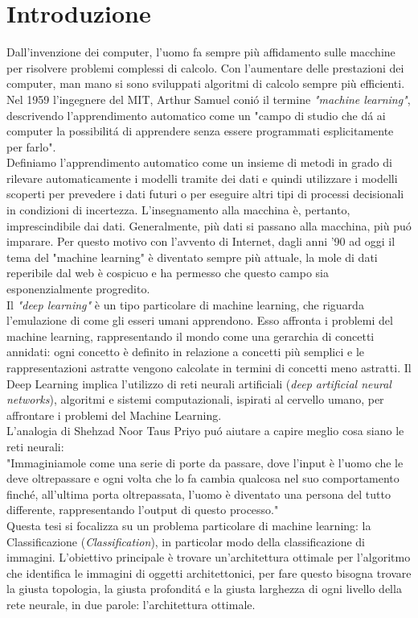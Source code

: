 \documentclass[a4paper,12pt]{report}
\begin{document}
\section*{Introduzione}
Dall'invenzione dei computer, l'uomo fa sempre pi\`{u} affidamento sulle macchine per risolvere problemi complessi di calcolo. Con l'aumentare delle prestazioni dei computer, man mano si sono sviluppati algoritmi di calcolo sempre pi\`{u} efficienti.
Nel 1959 l'ingegnere del MIT, Arthur Samuel coni\'{o} il termine \textit{"machine learning"}, descrivendo l'apprendimento automatico come un "campo di studio che d\'{a} ai computer la possibilit\'{a} di apprendere senza essere programmati esplicitamente per farlo".\cite{Samuel} \\
Definiamo l'apprendimento automatico come un insieme di metodi in grado di rilevare automaticamente i modelli tramite dei dati e quindi utilizzare i modelli scoperti per prevedere i dati futuri o per eseguire altri tipi di processi decisionali in condizioni di incertezza. L'insegnamento alla macchina \`e, pertanto, imprescindibile dai dati. Generalmente, pi\`{u} dati si passano alla macchina, pi\`{u} pu\'{o} imparare. Per questo motivo con l'avvento di Internet, dagli anni '90 ad oggi il tema del "machine learning" \`e diventato sempre pi\`{u} attuale, la mole di dati reperibile dal web \`e cospicuo e ha permesso che questo campo sia esponenzialmente progredito.\\
Il \textit{"deep learning"} \`e un tipo particolare di machine learning, che riguarda l'emulazione di come gli esseri umani apprendono. Esso affronta i problemi del machine learning, rappresentando il mondo come una gerarchia di concetti annidati: ogni concetto \`e definito in relazione a concetti pi\`{u} semplici e le rappresentazioni astratte vengono calcolate in termini di concetti meno astratti. Il Deep Learning implica l'utilizzo di reti neurali artificiali (\textit{deep artificial neural networks}), algoritmi e sistemi computazionali, ispirati al cervello umano, per affrontare i problemi del Machine Learning.\\
L'analogia di Shehzad Noor Taus Priyo pu\'{o} aiutare a capire meglio cosa siano le reti neurali:\\
"Immaginiamole come una serie di porte da passare, dove l'input \`e l'uomo che le deve oltrepassare e ogni volta che lo fa cambia qualcosa nel suo comportamento finch\'{e}, all'ultima porta oltrepassata, l'uomo \`e diventato una persona del tutto differente, rappresentando l'output di questo processo."\cite{analogia} \\
Questa tesi si focalizza su un problema particolare di machine learning: la Classificazione (\textit{Classification}), in particolar modo della classificazione di immagini. L'obiettivo principale \`e trovare un'architettura ottimale per l'algoritmo che identifica le immagini di oggetti architettonici, per fare questo bisogna trovare la giusta topologia, la giusta profondit\'{a} e la giusta larghezza di ogni livello della rete neurale, in due parole: l'architettura ottimale. %
 
\end{document}
